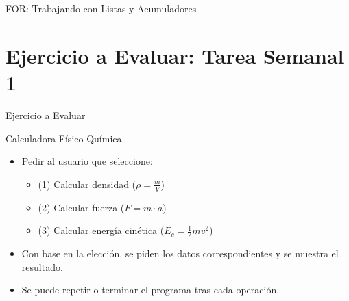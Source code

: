 \documentclass[10pt]{beamer}
\begin{document}
\begin{frame}[fragile]{FOR: Trabajando con Listas y Acumuladores}
\section{Ejercicio a Evaluar: Tarea Semanal 1}
\begin{frame}{Ejercicio a Evaluar}
  \begin{block}{Calculadora Físico-Química}
    \begin{itemize}
      \item Pedir al usuario que seleccione:
        \begin{itemize}
          \item (1) Calcular densidad (\(\rho = \frac{m}{V}\))
          \item (2) Calcular fuerza (\(F = m \cdot a\))
          \item (3) Calcular energía cinética (\(E_c = \frac{1}{2}mv^2\))
        \end{itemize}
      \item Con base en la elección, se piden los datos correspondientes y se muestra el resultado.
      \item Se puede repetir o terminar el programa tras cada operación.
    \end{itemize}
  \end{block}
\end{frame}



\end{frame}
\end{document}
